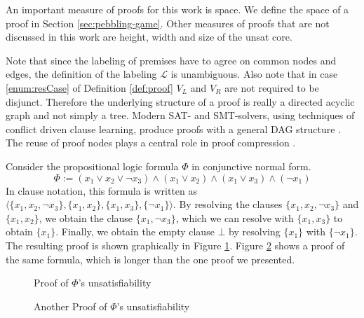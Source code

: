 An important measure of proofs for this work is space.
We define the space of a proof in Section \ref{sec:pebbling-game}.
Other measures of proofs that are not discussed in this work are height, width and size of the unsat core.

\noindent
Note that since the labeling of premises have to agree on common nodes and edges, the definition of the labeling $\mathcal{L}$ is unambiguous.
Also note that in case \ref{enum:resCase} of Definition \ref{def:proof} $V_L$ and $V_R$ are not required to be disjunct. 
Therefore the underlying structure of a proof is really a directed acyclic graph and not simply a tree. 
Modern SAT- and SMT-solvers, using techniques of conflict driven clause learning, produce proofs with a general DAG structure \cite{Bouton2009,Biere2009}.
The reuse of proof nodes plays a central role in proof compression \cite{Fontaine2011}.

\begin{example}

Consider the propositional logic formula $\Phi$ in conjunctive normal form.
$$\Phi := (x_1 \vee x_2 \vee \neg x_3) \wedge (x_1 \vee x_2) \wedge (x_1 \vee x_3) \wedge (\neg x_1)$$
In clause notation, this formula is written as $\langle \{x_1, x_2, \neg x_3\}, \{x_1, x_2\}, \{x_1, x_3\}, \{\neg x_1\} \rangle$.
By resolving the clauses $\{x_1, x_2, \neg x_3\}$ and $\{x_1, x_2\}$, we obtain the clause $\{x_1,\neg x_3\}$, which we can resolve with $\{x_1, x_3\}$ to obtain $\{x_1\}$.
Finally, we obtain the empty clause $\bot$ by resolving $\{x_1\}$ with $\{\neg x_1\}$.
The resulting proof is shown graphically in Figure \ref{fig:resolutionexample}.
Figure \ref{fig:resolutionexample2} shows a proof of the same formula, which is longer than the one proof we presented.

\begin{figure}[!h]


\caption{Proof of $\Phi$'s unsatisfiability}
\label{fig:resolutionexample}
\end{figure}

\begin{figure}[!h]


\caption{Another Proof of $\Phi$'s unsatisfiability}
\label{fig:resolutionexample2}
\end{figure}

\end{example}